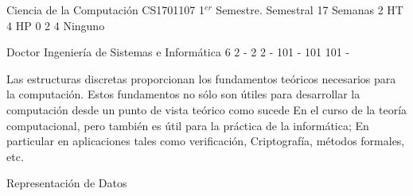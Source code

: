 \documentclass[a4paper,8pt]{article}
\begin{document}
\setNombreProfesor{}
\setGradoProfesorAbreviado{}
\sylabusHeader

\academicaTable
{Ciencia de la Computación} %
{CS1701107} %
{1$^{er}$ Semestre.} %
{Semestral} %
{17 Semanas} %
{2 HT} %
{4 HP} %
{0} %
{}  %
{2} %
{4} %
{Ninguno} %

\administrativaTable
{Doctor} %
{Ingeniería de Sistemas e Informática} %
{6} %
{2} %
{-} %
{2} %
{2} %
{-} %
{101} %
{-} %
{101} %
{101} %
{-} %


\begin{fundamentacion}
Las estructuras discretas proporcionan los fundamentos teóricos necesarios para la computación. Estos fundamentos no sólo son útiles para desarrollar la computación desde un punto de vista teórico como sucede
En el curso de la teoría computacional, pero también es útil para la práctica de la informática; En particular en aplicaciones tales como verificación,
Criptografía, métodos formales, etc.

\end{fundamentacion}

\begin{sumilla}
\item \DSSetsRelationsandFunctions
\item \DSBasicLogic
\item \DSProofTechniques
\item Representación de Datos

\end{sumilla}

\begin{competenciasAsignatura}
\item {}
\item {}

\end{competenciasAsignatura}
\end{document}
